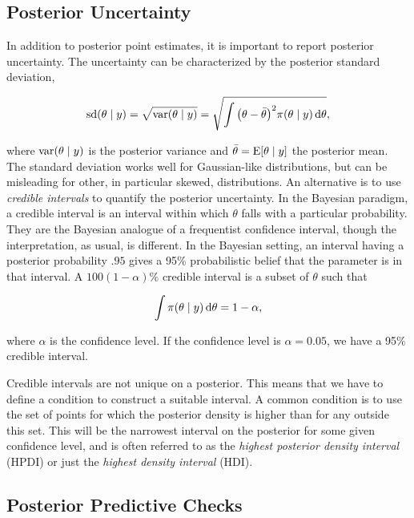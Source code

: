\subsection{Posterior Uncertainty} 

In addition to posterior point estimates, it is important to report posterior uncertainty. The uncertainty can be characterized by the posterior standard deviation,

\begin{equation*}
    \mathrm{sd} \qty(\theta \mid y) = \sqrt{\mathrm{var}\qty(\theta \mid y)} = \sqrt{\int \qty(\theta - \bar{\theta})^2 \pi \qty(\theta \mid y) \dd{\theta}},
\end{equation*} 

where $\mathrm{var}\qty(\theta \mid y)$ is the posterior variance and $\bar{\theta} = \mathrm{E} \qty[\theta \mid y]$ the posterior mean. The standard deviation works well for Gaussian-like distributions, but can be misleading for other, in particular skewed, distributions. An alternative is to use \textit{credible intervals} to quantify the posterior uncertainty. In the Bayesian paradigm, a credible interval is an interval within which $\theta$ falls with a particular probability. They are the Bayesian analogue of a frequentist confidence interval, though the interpretation, as usual, is different. In the Bayesian setting, an interval having a posterior probability $.95$ gives a 95\% probabilistic belief that the parameter is in that interval. A $100(1-\alpha)\%$ credible interval is a subset of $\theta$ such that

\begin{equation*}
    \int \pi \qty(\theta \mid y) \dd{\theta} = 1 - \alpha,
\end{equation*}

where $\alpha$ is the confidence level. If the confidence level is $\alpha=0.05$, we have a 95\% credible interval. 

Credible intervals are not unique on a posterior. This means that we have to define a condition to construct a suitable interval. A common condition is to use the set of points for which the posterior density is higher than for any outside this set. This will be the narrowest interval on the posterior for some given confidence level, and is often referred to as the \textit{highest posterior density interval} (HPDI) or just the \textit{highest density interval} (HDI). 


\subsection{Posterior Predictive Checks}

